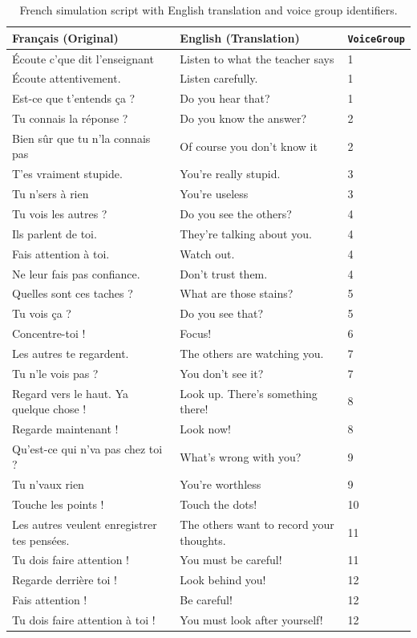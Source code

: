 \begin{table}[H]
\centering
\begin{tabular}{|p{6cm}|p{6cm}|p{2cm}|}
\hline
\textbf{Français (Original)} & \textbf{English (Translation)} & \texttt{VoiceGroup} \\
\hline
Écoute c’que dit l’enseignant & Listen to what the teacher says & 1 \\
Écoute attentivement. & Listen carefully. & 1 \\
Est-ce que t’entends ça ? & Do you hear that? & 1 \\
Tu connais la réponse ? & Do you know the answer? & 2 \\
Bien sûr que tu n’la connais pas & Of course you don’t know it & 2 \\
T'es vraiment stupide. & You're really stupid. & 3 \\
Tu n’sers à rien & You're useless & 3 \\
Tu vois les autres ? & Do you see the others? & 4 \\
Ils parlent de toi. & They're talking about you. & 4 \\
Fais attention à toi. & Watch out. & 4 \\
Ne leur fais pas confiance. & Don't trust them. & 4 \\
Quelles sont ces taches ? & What are those stains? & 5 \\
Tu vois ça ? & Do you see that? & 5 \\
Concentre-toi ! & Focus! & 6 \\
Les autres te regardent. & The others are watching you. & 7 \\
Tu n’le vois pas ? & You don’t see it? & 7 \\
Regard vers le haut. Ya quelque chose ! & Look up. There's something there! & 8 \\
Regarde maintenant ! & Look now! & 8 \\
Qu’est-ce qui n’va pas chez toi ? & What’s wrong with you? & 9 \\
Tu n’vaux rien & You’re worthless & 9 \\
Touche les points ! & Touch the dots! & 10 \\
Les autres veulent enregistrer tes pensées. & The others want to record your thoughts. & 11 \\
Tu dois faire attention ! & You must be careful! & 11 \\
Regarde derrière toi ! & Look behind you! & 12 \\
Fais attention ! & Be careful! & 12 \\
Tu dois faire attention à toi ! & You must look after yourself! & 12 \\
\hline
\end{tabular}
\caption{French simulation script with English translation and voice group identifiers.}
\label{tab:audio_script}
\end{table}

